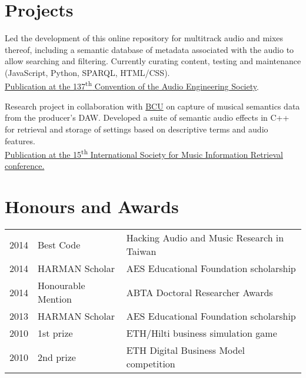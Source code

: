 \documentclass[letterpaper]{deedy-resume} %
\begin{document}
{\begin{minipage}[t]{0.66\textwidth}

\section{Projects}

\hspace{-0.1cm}

Led the development of this online repository for multitrack audio and mixes thereof, including a semantic database of metadata associated with the audio to allow searching and filtering. 
Currently curating content, testing and maintenance (JavaScript, Python, SPARQL, HTML/CSS).\\
\href{http://www.brechtdeman.com/downloads/aes137.pdf}{Publication at the 137\textsuperscript{th} Convention of the Audio Engineering Society}. 

\sectionspace %


\hspace{-0.1cm}
Research project in collaboration with \href{http://www.bcu.ac.uk}{BCU} on capture of musical semantics data from the producer's DAW. 
Developed a suite of semantic audio effects in C++ for retrieval and storage of settings based on descriptive terms and audio features. \\
\href{http://www.terasoft.com.tw/conf/ismir2014/LBD/LBD15.pdf}{Publication at the 15\textsuperscript{th} International Society for Music Information Retrieval conference.}



\section{Honours and Awards} 

\begin{tabular}{@{}rll}
2014 & Best Code & Hacking Audio and Music Research in Taiwan\\
2014 & HARMAN Scholar & AES Educational Foundation scholarship\\
2014 & Honourable Mention & ABTA Doctoral Researcher Awards \\
2013 & HARMAN Scholar & AES Educational Foundation scholarship\\
2010 & 1st prize & ETH/Hilti business simulation game\\
2010 & 2nd prize & ETH Digital Business Model competition
\end{tabular}


\end{minipage}}
\end{document}
